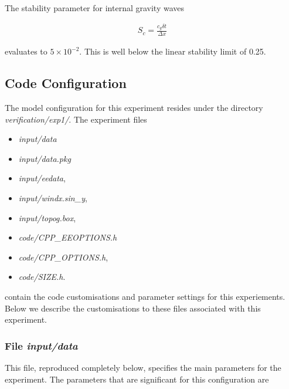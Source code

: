 \noindent The stability parameter for internal gravity waves 
\cite{Adcroft_thesis}

\begin{eqnarray}
\label{EQ:igw_stability}
S_{c} = \frac{c_{g} \delta t}{ \Delta x}
\end{eqnarray}

\noindent evaluates to $5 \times 10^{-2}$. This is well below the linear
stability limit of 0.25.
  
\subsection{Code Configuration}
\label{SEC:eg_fourl_code_config}

The model configuration for this experiment resides under the 
directory {\it verification/exp1/}.  The experiment files 
\begin{itemize}
\item {\it input/data}
\item {\it input/data.pkg}
\item {\it input/eedata},
\item {\it input/windx.sin\_y},
\item {\it input/topog.box},
\item {\it code/CPP\_EEOPTIONS.h}
\item {\it code/CPP\_OPTIONS.h},
\item {\it code/SIZE.h}. 
\end{itemize}
contain the code customisations and parameter settings for this 
experiements. Below we describe the customisations
to these files associated with this experiment.

\subsubsection{File {\it input/data}}

This file, reproduced completely below, specifies the main parameters 
for the experiment. The parameters that are significant for this configuration
are

